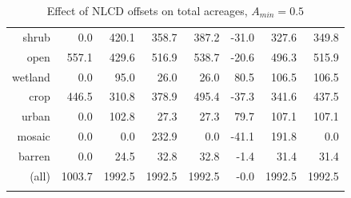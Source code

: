 \begin{Schunk}
\begin{table}[ht]
\begin{center}
{\begin{tabular}{rrrrrrrr}
  shrub & 0.0 & 420.1 & 358.7 & 387.2 & -31.0 & 327.6 & 349.8 \\ 
  open & 557.1 & 429.6 & 516.9 & 538.7 & -20.6 & 496.3 & 515.9 \\ 
  wetland & 0.0 & 95.0 & 26.0 & 26.0 & 80.5 & 106.5 & 106.5 \\ 
  crop & 446.5 & 310.8 & 378.9 & 495.4 & -37.3 & 341.6 & 437.5 \\ 
  urban & 0.0 & 102.8 & 27.3 & 27.3 & 79.7 & 107.1 & 107.1 \\ 
  mosaic & 0.0 & 0.0 & 232.9 & 0.0 & -41.1 & 191.8 & 0.0 \\ 
  barren & 0.0 & 24.5 & 32.8 & 32.8 & -1.4 & 31.4 & 31.4 \\ 
  (all) & 1003.7 & 1992.5 & 1992.5 & 1992.5 & -0.0 & 1992.5 & 1992.5 \\ 
   \noalign{\smallskip} \hline
\end{tabular}
}
\caption{Effect of NLCD offsets on total acreages, $A_{min}=0.5$}
\label{tab:areas2}
\end{center}
\end{table}\begin{Sinput}
 
 
\end{Sinput}
\end{Schunk}



